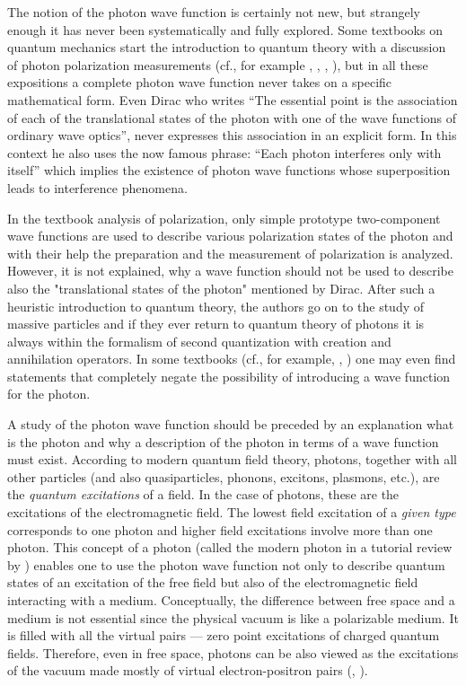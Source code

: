 \documentclass{article}
\begin{document}
The notion of the photon wave function is certainly not new, but strangely
enough it has never been systematically and fully explored. Some textbooks
on quantum mechanics start the introduction to quantum theory with a
discussion of photon polarization measurements (cf., for example
\cite{Dirac_58}, \cite{Baym_69}, \cite{Lipkin_73}, \cite{CTDL_77}), but in
all these expositions a complete photon wave function never takes on a
specific mathematical form. Even Dirac who writes ``The essential point is
the association of each of the translational states of the photon with one
of the wave functions of ordinary wave optics'', never expresses  this association in an explicit form. In this context he also uses the now famous
phrase: ``Each photon interferes only with itself'' which implies the
existence of photon wave functions whose superposition leads to interference
phenomena.

In the textbook analysis of polarization, only simple prototype
two-com\-po\-nent wave functions are used to describe various polarization
states of the photon and with their help the preparation and the measurement
of polarization is analyzed. However, it is not explained, why a wave
function should not be used to describe also the "translational states of
the photon" mentioned by Dirac. After such a heuristic introduction to
quantum theory, the authors go on to the study of massive particles and if
they ever return to quantum theory of photons it is always within the
formalism of second quantization with creation and annihilation operators.
In some textbooks (cf., for example, \cite{Bohm_54}, \cite{Power_64}) one
may even find statements that completely negate the possibility of
introducing a wave function for the photon.

A study of the photon wave function should be preceded by an explanation
what is the photon and why a description of the photon in terms of a wave
function must exist. According to modern quantum field theory, photons,
together with all other particles (and also quasiparticles, phonons,
excitons, plasmons, etc.), are the {\em quantum excitations} of a field. In
the case of photons, these are the excitations of the electromagnetic field.
The lowest field excitation of a {\em given type} corresponds to one photon and
higher field excitations involve more than one photon. This concept of a
photon (called the modern photon in a tutorial review by \cite{KAA_89})
enables one to use the photon wave function not only to describe quantum
states of an excitation of the free field but also of the electromagnetic
field interacting with a medium. Conceptually, the difference between free
space and a medium is not essential since the physical vacuum is like a
polarizable medium. It is filled with all the virtual pairs --- zero point excitations of charged quantum fields. Therefore, even in free space, photons can be also viewed as the excitations of the vacuum made mostly of virtual
electron-positron pairs (\cite{IBB_63}, \cite{Bjorken_63}).
\end{document}

